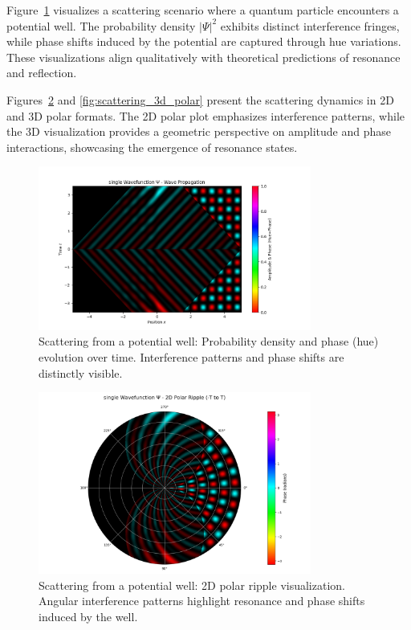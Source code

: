 \documentclass[12pt]{article}
\begin{document}
Figure~\ref{fig:scattering_density} visualizes a scattering scenario where a quantum particle encounters a potential well. The probability density \(|\Psi|^2\) exhibits distinct interference fringes, while phase shifts induced by the potential are captured through hue variations. These visualizations align qualitatively with theoretical predictions of resonance and reflection.

Figures~\ref{fig:scattering_2d_polar} and \ref{fig:scattering_3d_polar} present the scattering dynamics in 2D and 3D polar formats. The 2D polar plot emphasizes interference patterns, while the 3D visualization provides a geometric perspective on amplitude and phase interactions, showcasing the emergence of resonance states.

\begin{figure}[H]
\centering
\includegraphics[width=0.8\textwidth]{images/scattering_wavefunction_probability_density_with_phase.png}
\caption{Scattering from a potential well: Probability density and phase (hue) evolution over time. Interference patterns and phase shifts are distinctly visible.}
\label{fig:scattering_density}
\end{figure}

\begin{figure}[H]
\centering
\includegraphics[width=0.8\textwidth]{images/scattering_wavefunction_2d_polar_probability_density_with_phase.png}
\caption{Scattering from a potential well: 2D polar ripple visualization. Angular interference patterns highlight resonance and phase shifts induced by the well.}
\label{fig:scattering_2d_polar}
\end{figure}
\end{document}
